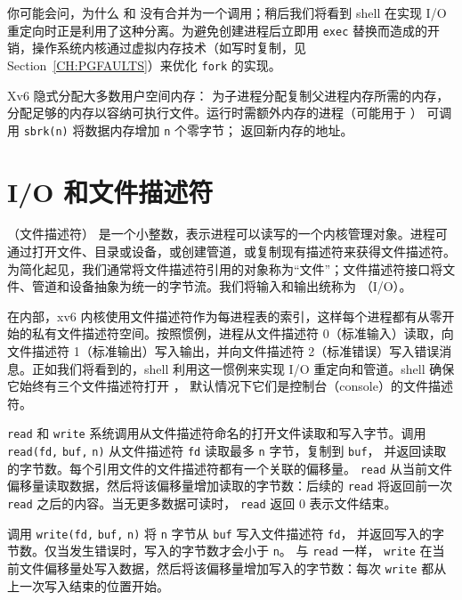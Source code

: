 你可能会问，为什么
和
没有合并为一个调用；稍后我们将看到 shell 在实现 I/O 重定向时正是利用了这种分离。为避免创建进程后立即用 \lstinline{exec} 替换而造成的开销，操作系统内核通过虚拟内存技术（如写时复制，见 Section~\ref{CH:PGFAULTS}）来优化
\lstinline{fork}
的实现。

Xv6 隐式分配大多数用户空间内存：
为子进程分配复制父进程内存所需的内存，
分配足够的内存以容纳可执行文件。运行时需额外内存的进程（可能用于
）
可调用
\lstinline{sbrk(n)}
将数据内存增加
\lstinline{n}
个零字节；
返回新内存的地址。

\section{I/O 和文件描述符}

（文件描述符）
是一个小整数，表示进程可以读写的一个内核管理对象。进程可通过打开文件、目录或设备，或创建管道，或复制现有描述符来获得文件描述符。为简化起见，我们通常将文件描述符引用的对象称为``文件''；文件描述符接口将文件、管道和设备抽象为统一的字节流。我们将输入和输出统称为 （I/O）。

在内部，xv6 内核使用文件描述符作为每进程表的索引，这样每个进程都有从零开始的私有文件描述符空间。按照惯例，进程从文件描述符 0（标准输入）读取，向文件描述符 1（标准输出）写入输出，并向文件描述符 2（标准错误）写入错误消息。正如我们将看到的，shell 利用这一惯例来实现 I/O 重定向和管道。shell 确保它始终有三个文件描述符打开
，
默认情况下它们是控制台（console）的文件描述符。

\lstinline{read}
和
\lstinline{write}
系统调用从文件描述符命名的打开文件读取和写入字节。调用
\lstinline{read(fd,}
\lstinline{buf,}
\lstinline{n)}
从文件描述符
\lstinline{fd}
读取最多
\lstinline{n}
字节，复制到
\lstinline{buf}，
并返回读取的字节数。每个引用文件的文件描述符都有一个关联的偏移量。
\lstinline{read}
从当前文件偏移量读取数据，然后将该偏移量增加读取的字节数：后续的
\lstinline{read}
将返回前一次
\lstinline{read}
之后的内容。当无更多数据可读时，
\lstinline{read}
返回 0 表示文件结束。

调用
\lstinline{write(fd,}
\lstinline{buf,}
\lstinline{n)}
将
\lstinline{n}
字节从
\lstinline{buf}
写入文件描述符
\lstinline{fd}，
并返回写入的字节数。仅当发生错误时，写入的字节数才会小于
\lstinline{n}。
与
\lstinline{read}
一样，
\lstinline{write}
在当前文件偏移量处写入数据，然后将该偏移量增加写入的字节数：每次
\lstinline{write}
都从上一次写入结束的位置开始。

